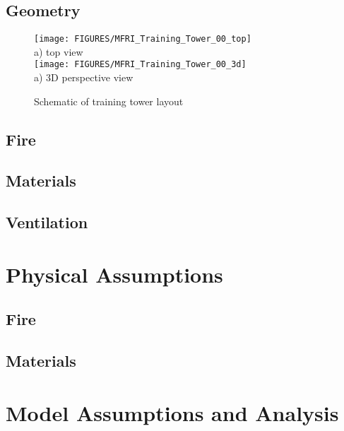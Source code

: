 \documentclass[11pt]{book}
\begin{document}
\subsection{Geometry}


\begin{figure}[\figoptions]
\begin{center}
\texttt{[image: FIGURES/MFRI\_Training\_Tower\_00\_top]}\\
a) top view\\
\texttt{[image: FIGURES/MFRI\_Training\_Tower\_00\_3d]}\\
a) 3D perspective view\\
\end{center}
\caption {Schematic of training tower layout}
\label{figflashoverplan}%
\end{figure}
\subsection{Fire}

\subsection{Materials}

\subsection{Ventilation}

\section{Physical Assumptions}
\subsection{Fire}

\subsection{Materials}

\section{Model Assumptions and Analysis}
\end{document}
